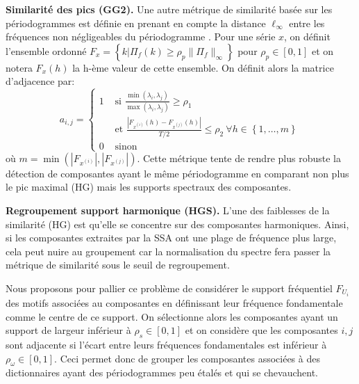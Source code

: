 \documentclass{gretsi}
\newcommand{\set}[1]{\left \{ 1, \dots, #1 \right \}}
\newcommand{\inter}{\left[0, 1\right]}
\begin{document}
\noindent\textbf{Similarité des pics (GG2).}\label{par:GG2}
    Une autre métrique de similarité basée sur les périodogrammes est définie en prenant en compte la distance $\ell_\infty$ entre les fréquences non négligeables du périodogramme \cite{abalov_14_auto}.
    Pour une série $x$, on définit l'ensemble ordonné $F_x = \left \{ k | \Pi_f(k) \ge \rho_p \|\Pi_f\|_\infty \right \}$ pour $\rho_p \in \inter$ et on notera $F_x(h)$ la h-ème valeur de cette ensemble.
    On définit alors la matrice d'adjacence par:
    \begin{equation}
        a_{i, j} = 
        \begin{cases}
	        1 & \text{ si } \displaystyle\frac{\min(\lambda_i, \lambda_j)}{\max(\lambda_i, \lambda_j)} \ge \rho_1\\
	          & \text{ et } \frac{|F_{x^{(i)}}(h) - F_{x^{(j)}}(h)|}{T/2} \le \rho_2\ \forall h \in \set{m}\\
	        0 & \text{ sinon}
        \end{cases}
    \end{equation} 
    où $m = \min\left(\left|F_{x^{(i)}}\right|, \left|F_{x^{(j)}}\right|\right)$.
    Cette métrique tente de rendre plus robuste la détection de composantes ayant le même périodogramme en comparant non plus le pic maximal (HG) mais les supports spectraux des composantes. 


\noindent\textbf{Regroupement support harmonique (HGS).}\label{par:HGS}
    L'une des faiblesses de la similarité (HG) est qu'elle se concentre sur des composantes harmoniques. 
    Ainsi, si les composantes extraites par la SSA ont une plage de fréquence plus large, cela peut nuire au groupement car la normalisation du spectre fera passer la métrique de similarité sous le seuil de regroupement.

    Nous proposons pour pallier ce problème de considérer le support fréquentiel $F_{U_i}$ des motifs associées au composantes en définissant leur fréquence fondamentale comme le centre de ce support.
    On sélectionne alors les composantes ayant un support de largeur inférieur à $\rho_s \in \inter$ et on considère que les composantes $i, j$ sont adjacente si l'écart entre leurs fréquences fondamentales est inférieur à $\rho_\omega \in \inter$.
    Ceci permet donc de grouper les composantes associées à des dictionnaires ayant des périodogrammes peu étalés et qui se chevauchent.
\end{document}
